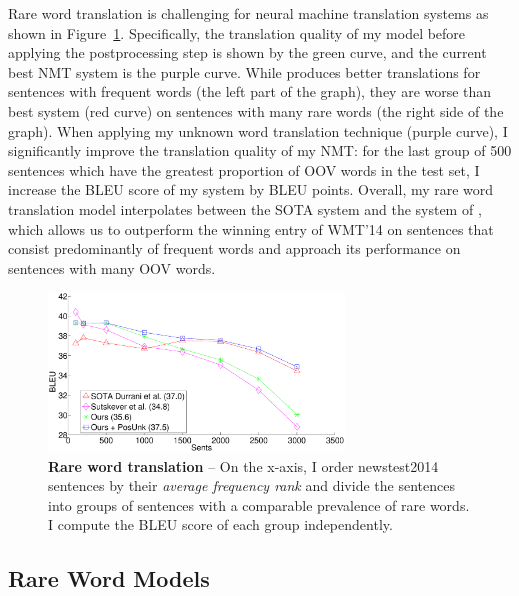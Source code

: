 Rare word translation is challenging for neural machine translation systems as
shown in Figure~\ref{f:rare}. Specifically, the translation quality of my
model before applying the postprocessing step is shown by the green curve, and the current
best NMT system \cite{sutskever14} is the purple curve. While \cite{sutskever14}
produces better translations for sentences with frequent words (the left part of the
graph), they are worse than best system (red curve)
on sentences with many rare words (the right side of the graph). When applying my
unknown word translation technique (purple curve), I
significantly improve the translation quality of my NMT: 
for the last group of 500 sentences which have the greatest proportion of 
OOV words in the test set, I increase the BLEU score of my system by 
\imprare{} BLEU points. Overall, my rare word translation model 
interpolates between the SOTA system and the system
of ,  which allows us to outperform the winning entry of WMT'14
on sentences that consist predominantly of frequent words and approach its performance on sentences
with many OOV words.
\begin{figure}
\centering
\includegraphics[width=0.7\textwidth, clip=true, trim= 95 0 230 0]{img/3-rare} %
\caption[Rare word translation]{{\bf Rare word translation} -- 
On the x-axis, I order newstest2014 sentences by their {\it average frequency rank} and divide the sentences into groups 
of sentences with a comparable prevalence of rare words. 
I compute the BLEU score of each group independently.} 
\label{f:rare}
\end{figure}


\subsection{Rare Word Models}
\label{subsec:rare_model_compare}


